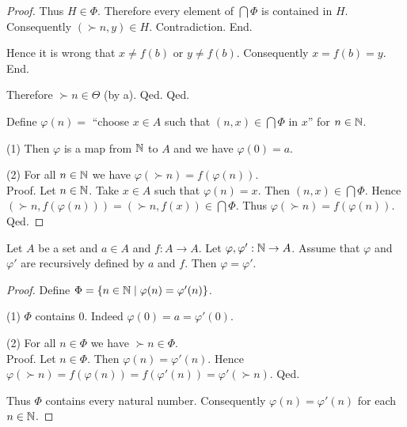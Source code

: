 \documentclass[../arithmetic.tex]{subfiles}
\begin{document}
\begin{forthel}
\begin{proof}
              Thus $H \in \Phi$.
              Therefore every element of $\bigcap \Phi$ is contained in $H$.
              Consequently $(\succ{n},y) \in H$.
              Contradiction.
            End.

            Hence it is wrong that $x \neq f(b)$ or $y \neq f(b)$.
            Consequently $x = f(b) = y$.
          End.

          Therefore $\succ{n} \in \Theta$ (by a).
        Qed.
      Qed.

      Define $\varphi(n) =$ ``choose $x \in A$ such that $(n, x) \in
      \bigcap \Phi$ in $x$'' for $n \in \mathbb{N}$.

      (1) Then $\varphi$ is a map from $\mathbb{N}$ to $A$ and we have
      $\varphi(0) = a$.

      (2) For all $n \in \mathbb{N}$ we have $\varphi(\succ{n}) =
      f(\varphi(n))$. \\
      Proof.
        Let $n \in \mathbb{N}$.
        Take $x \in A$ such that $\varphi(n) = x$.
        Then $(n, x) \in \bigcap \Phi$.
        Hence $(\succ{n}, f(\varphi(n))) = (\succ{n}, f(x)) \in \bigcap \Phi$.
        Thus $\varphi(\succ{n}) = f(\varphi(n))$.
      Qed.
    \end{proof}
  \end{forthel}

  \begin{forthel}
    \begin{proposition}
      Let $A$ be a set and $a \in A$ and $f : A \to A$.
      Let $\varphi, \varphi' : \mathbb{N} \to A$.
      Assume that $\varphi$ and $\varphi'$ are recursively defined by $a$ and
      $f$.
      Then $\varphi = \varphi'$.
    \end{proposition}
    \begin{proof}
      Define $\Phi = \{ n \in \mathbb{N} \mid \varphi(n) = \varphi'(n) \}$.

      (1) $\Phi$ contains $0$.
      Indeed $\varphi(0) = a = \varphi'(0)$.

      (2) For all $n \in \Phi$ we have $\succ{n} \in \Phi$. \\
      Proof.
        Let $n \in \Phi$.
        Then $\varphi(n) = \varphi'(n)$.
        Hence $\varphi(\succ{n})
          = f(\varphi(n))
          = f(\varphi'(n))
          = \varphi'(\succ{n})$.
      Qed.

      Thus $\Phi$ contains every natural number.
      Consequently $\varphi(n) = \varphi'(n)$ for each $n \in \mathbb{N}$.
    \end{proof}
  \end{forthel}
\end{document}
